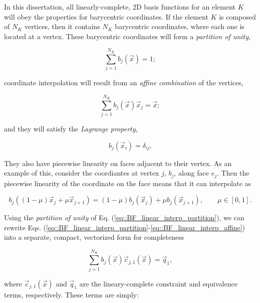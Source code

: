 In this dissertation, all linearly-complete, 2D basis functions for an element $K$ will obey the properties for barycentric coordinates. If the element $K$ is composed of $N_K$ vertices, then it contains $N_K$ barycentric coordinates, where each one is located at a vertex. These barycentric coordinates will form a {\em partition of unity},

\begin{equation}
\sum_{j=1}^{N_K} b_j (\vec{x})  =  1;
\label{eq::BF_linear_interp_partition}
\end{equation}

\noindent coordinate interpolation will result from an {\em affine combination} of the vertices,

\begin{equation}
\sum_{j=1}^{N_K} b_j (\vec{x}) \vec{x}_j  =  \vec{x};
\label{eq::BF_linear_interp_affine}
\end{equation}

\noindent and they will satisfy the {\em Lagrange property},

\begin{equation}
b_j (\vec{x}_i) = \delta_{ij}.
\label{eq::BF_linear_interp_lagrange}
\end{equation}

\noindent They also have piecewise linearity on faces adjacent to their vertex. As an example of this, consider the coordiantes at vertex $j$, $b_j$, along face $e_j$. Then the piecewise linearity of the coordinate on the face means that it can interpolate as

\begin{equation}
\label{eq::BF_linear_bound_interp}
b_j ((1-\mu ) \vec{x}_j  + \mu \vec{x}_{j+1})  = (1-\mu ) b_j (\vec{x}_j ) + \mu b_j (\vec{x}_{j+1} ) , \qquad \mu \in [0,1].
\end{equation}

Using the {\em partition of unity} of Eq. (\ref{eq::BF_linear_interp_partition}), we can rewrite Eqs. (\ref{eq::BF_linear_interp_partition}-\ref{eq::BF_linear_interp_affine}) into a separate, compact, vectorized form for completeness

\begin{equation}
\sum_{j=1}^{N_K}  b_j (\vec{x}) \vec{c}_{j,1}(\vec{x}) = \vec{q}_1 ,
\label{eq::BF_linear_interp_req_vector}
\end{equation}

\noindent where $\vec{c}_{j,1}(\vec{x})$ and $\vec{q}_1$ are the lineary-complete constraint and equivalence terms, respectively. These terms are simply:

